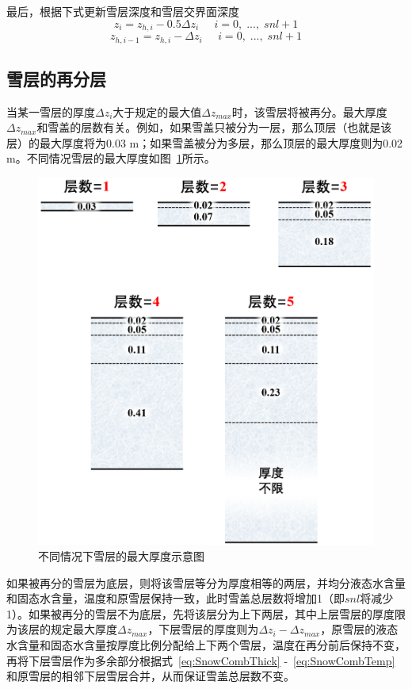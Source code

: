 最后，根据下式更新雪层深度和雪层交界面深度
\begin{equation}
    z_i=z_{h,i}-0.5\Delta z_i \;\;\;\;\;i=0,\;...,\;snl+1
\end{equation}
\begin{equation}
    z_{h,i-1}=z_{h,i}-\Delta z_i \;\;\;\;\;i=0,\;...,\;snl+1
\end{equation}



\subsection{雪层的再分层}\label{雪层的再分层}
当某一雪层的厚度$\Delta z_i$大于规定的最大值$\Delta z_{max}$时，该雪层将被再分。最大厚度$\Delta z_{max}$和雪盖的层数有关。例如，如果雪盖只被分为一层，那么顶层（也就是该层）的最大厚度将为0.03 \unit{m}；如果雪盖被分为多层，那么顶层的最大厚度则为0.02 \unit{m}。不同情况雪层的最大厚度如图~\ref{fig:不同情况下雪层的最大厚度}所示。

{
\begin{figure}[htbp]
\centering
\includegraphics[width=0.6\columnwidth]{Figures/雪盖土壤热力过程/不同情况下雪层的最大厚度.png}
\caption{不同情况下雪层的最大厚度示意图}
\label{fig:不同情况下雪层的最大厚度}
\end{figure}
}

如果被再分的雪层为底层，则将该雪层等分为厚度相等的两层，并均分液态水含量和固态水含量，温度和原雪层保持一致，此时雪盖总层数将增加1（即$snl$将减少1）。如果被再分的雪层不为底层，先将该层分为上下两层，其中上层雪层的厚度限为该层的规定最大厚度$\Delta z_{max}$，下层雪层的厚度则为$\Delta z_i - \Delta z_{max}$，原雪层的液态水含量和固态水含量按厚度比例分配给上下两个雪层，温度在再分前后保持不变，再将下层雪层作为多余部分根据式~\eqref{eq:SnowCombThick} -~\eqref{eq:SnowCombTemp}和原雪层的相邻下层雪层合并，从而保证雪盖总层数不变。

